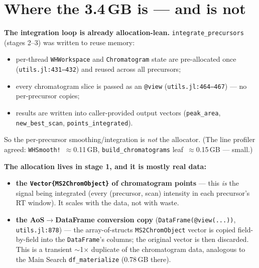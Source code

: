 \documentclass[11pt]{article}
\newcommand{\code}[1]{\texttt{\small #1}}
\begin{document}
\section{Where the 3.4\,GB is --- and is not}
\textbf{The integration loop is already allocation-lean.} \code{integrate\_precursors}
(stages 2--3) was written to reuse memory:
\begin{itemize}
  \item per-thread \code{WHWorkspace} and \code{Chromatogram} state are pre-allocated
  once (\code{utils.jl:431--432}) and reused across all precursors;
  \item every chromatogram slice is passed as an \code{@view} (\code{utils.jl:464--467})
  --- no per-precursor copies;
  \item results are written into caller-provided output vectors (\code{peak\_area},
  \code{new\_best\_scan}, \code{points\_integrated}).
\end{itemize}
So the per-precursor smoothing/integration is \emph{not} the allocator. (The line
profiler agreed: \code{WHSmooth!}~$\approx$0.11\,GB, \code{build\_chromatograms}
leaf~$\approx$0.15\,GB --- small.)

\textbf{The allocation lives in stage 1, and it is mostly real data:}
\begin{itemize}
  \item \textcolor{lo}{\textbf{the \code{Vector\{MS2ChromObject\}} of chromatogram
  points}} --- this \emph{is} the signal being integrated (every (precursor, scan)
  intensity in each precursor's RT window). It scales with the data, not with waste.
  \item \textcolor{lo}{\textbf{the AoS$\rightarrow$DataFrame conversion copy}}
  (\code{DataFrame(@view(...))}, \code{utils.jl:878}) --- the array-of-structs
  \code{MS2ChromObject} vector is copied field-by-field into the \code{DataFrame}'s
  columns; the original vector is then discarded. This is a transient $\sim$1$\times$
  duplicate of the chromatogram data, analogous to the Main Search
  \code{df\_materialize} (0.78\,GB there).
\end{itemize}
\end{document}
